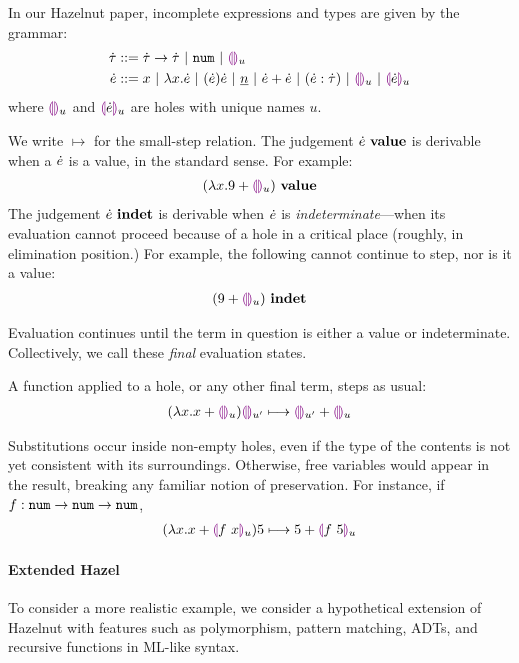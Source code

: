 
In our Hazelnut paper, incomplete expressions and types are given by the
grammar:
\begin{align*}
  \dot{\tau} & ::=
  \dot{\tau} \rightarrow \dot{\tau} ~\vert~
  \texttt{num} ~\vert~
  \textcolor{violet}{\llparenthesis}\textcolor{violet}{\rrparenthesis}_{u}
  \\
  \dot{e} & ::=   x ~\vert~
  \lambda x.\dot{e} ~\vert~
  (\dot{e})\dot{e} ~\vert~
  \underline{n} ~\vert~
  \dot{e} + \dot{e} ~\vert~
  (\dot{e} : \dot{\tau}) ~\vert~
  \textcolor{violet}{\llparenthesis}\textcolor{violet}{\rrparenthesis}_{u} ~\vert~
  \textcolor{violet}{\llparenthesis}\dot{e}\textcolor{violet}{\rrparenthesis}_{u}
\end{align*}
where $\textcolor{violet}{\llparenthesis}\textcolor{violet}{\rrparenthesis}_{u}$ and $\textcolor{violet}{\llparenthesis}\dot{e}\textcolor{violet}{\rrparenthesis}_{u}$ are holes with unique names $u$.

We write $\mapsto$ for the small-step relation. The judgement
${\dot{e}} ~\mathbf{value}$ is derivable when a $\dot{e}$ is a value, in the standard
sense. For example:
\begin{align*}
  {(\lambda x. 9 + \textcolor{violet}{\llparenthesis}\textcolor{violet}{\rrparenthesis}_{u})} ~\mathbf{value}
\end{align*}
The judgement ${\dot{e}} ~\mathbf{indet}$ is derivable when $\dot{e}$ is
\textit{indeterminate}---when its evaluation cannot proceed because of a
hole in a critical place (roughly, in elimination position.) For example,
the following cannot continue to step, nor is it a value:
\begin{align*}
  {(9 + \textcolor{violet}{\llparenthesis}\textcolor{violet}{\rrparenthesis}_{u})} ~\mathbf{indet}
\end{align*}

Evaluation continues until the term in question is either a value or
indeterminate. Collectively, we call these \emph{final} evaluation states.

A function applied to a hole, or any other final term, steps as usual:
\begin{align*}
      {
        (\lambda x.x + \textcolor{violet}{\llparenthesis}\textcolor{violet}{\rrparenthesis}_{u})\textcolor{violet}{\llparenthesis}\textcolor{violet}{\rrparenthesis}_{u'}
      } \longmapsto {
        \textcolor{violet}{\llparenthesis}\textcolor{violet}{\rrparenthesis}_{u'} + \textcolor{violet}{\llparenthesis}\textcolor{violet}{\rrparenthesis}_{u}
      }
\end{align*}

Substitutions occur inside non-empty holes, even if the type of the
contents is not yet consistent with its surroundings. Otherwise, free
variables would appear in the result, breaking any familiar notion of
preservation. For instance, if $f : \texttt{num} \rightarrow \texttt{num} \rightarrow \texttt{num}$,
\begin{align*}
  {
        (\lambda x.x + \textcolor{violet}{\llparenthesis}f~x\textcolor{violet}{\rrparenthesis}_{u})5
      } \longmapsto {
        5 + \textcolor{violet}{\llparenthesis}f~5\textcolor{violet}{\rrparenthesis}_{u}
      }
\end{align*}

\paragraph{Extended Hazel}
To consider a more realistic example, we consider a hypothetical extension
of Hazelnut with features such as polymorphism, pattern matching, ADTs, and
recursive functions in ML-like syntax.

